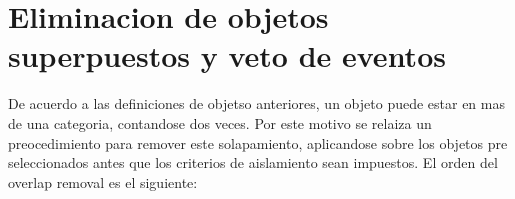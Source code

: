 %
%
%

\section{Eliminacion de objetos superpuestos y veto de eventos}
\label{sec:overlap_romoval_event_veto}

De acuerdo a las definiciones de objetso anteriores, un objeto puede estar en mas de una
categoria, contandose dos veces. Por este motivo se relaiza un preocedimiento para remover
este solapamiento, aplicandose sobre los objetos pre seleccionados antes que los criterios
de aislamiento sean impuestos. El orden del overlap removal es el siguiente:

